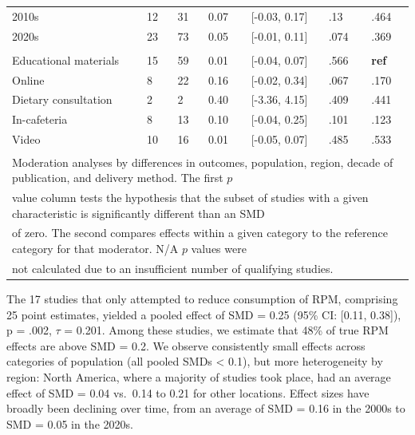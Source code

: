 \documentclass[preprint, 3p,
authoryear]{elsarticle} %
\begin{document}
\begin{table}[!h]
\begin{tabular}[t]{lllll>{\raggedright\arraybackslash}p{2 cm}>{\raggedright\arraybackslash}p{2 cm}}
\hspace{1em}2010s & 12 & 31 & 0.07 & {}[-0.03, 0.17] & .13 & .464\\
\hspace{1em}2020s & 23 & 73 & 0.05 & {}[-0.01, 0.11] & .074 & .369\\
\addlinespace[0.3em]
\multicolumn{7}{l}{\textbf{Method of Delivery}}\\
\hspace{1em}Educational materials & 15 & 59 & 0.01 & {}[-0.04, 0.07] & .566 & \textbf{ref}\\
\hspace{1em}Online & 8 & 22 & 0.16 & {}[-0.02, 0.34] & .067 & .170\\
\hspace{1em}Dietary consultation & 2 & 2 & 0.40 & {}[-3.36, 4.15] & .409 & .441\\
\hspace{1em}In-cafeteria & 8 & 13 & 0.10 & {}[-0.04, 0.25] & .101 & .123\\
\hspace{1em}Video & 10 & 16 & 0.01 & {}[-0.05, 0.07] & .485 & .533\\
\bottomrule
\multicolumn{7}{l}{\textsuperscript{} Moderation analyses by differences in outcomes, population, region, decade of publication, and delivery method. The first $p$}\\
\multicolumn{7}{l}{value column tests the hypothesis that the subset of studies with a given characteristic is significantly different than an SMD}\\
\multicolumn{7}{l}{of zero. The second compares effects within a given category to the reference category for that moderator. N/A $p$ values were}\\
\multicolumn{7}{l}{not calculated due to an insufficient number of qualifying studies.}\\
\end{tabular}
\end{table}

The 17 studies that only attempted to reduce consumption of RPM,
comprising 25 point estimates, yielded a pooled effect of SMD = 0.25
(95\% CI: {[}0.11, 0.38{]}), p = .002, \(\tau\) = 0.201. Among these
studies, we estimate that 48\% of true RPM effects are above SMD = 0.2.
We observe consistently small effects across categories of population
(all pooled SMDs \textless{} 0.1), but more heterogeneity by region:
North America, where a majority of studies took place, had an average
effect of SMD = 0.04 vs.~0.14 to 0.21 for other locations. Effect sizes
have broadly been declining over time, from an average of SMD = 0.16 in
the 2000s to SMD = 0.05 in the 2020s.
\end{document}
